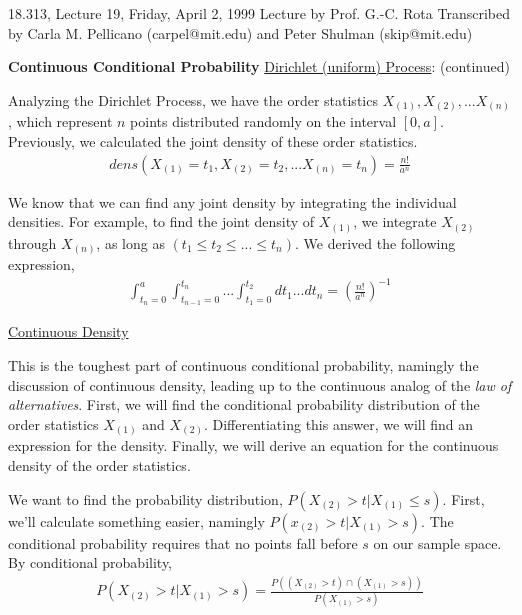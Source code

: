{\Large 18.313, Lecture 19, Friday, April 2, 1999}\newline
{\large Lecture by Prof. G.-C. Rota}\newline
Transcribed by Carla M. Pellicano (carpel@mit.edu) and Peter Shulman (skip@mit.edu)\newline

{\bf Continuous Conditional Probability}\newline
\noindent\underline{Dirichlet (uniform) Process}: (continued)

Analyzing the Dirichlet Process, we have the order statistics $X_{(1)},X_{(2)},...X_{(n)}$, which represent $n$ points distributed randomly on the interval $[0,a]$.  Previously, we calculated the joint density of these order statistics.
\begin{eqnarray*}
dens(X_{(1)}=t_1,X_{(2)}=t_2,...X_{(n)}=t_n)=\frac{n!}{a^n}
\end{eqnarray*}

We know that we can find any joint density by integrating the individual densities.  For example, to find the joint density of $X_{(1)}$, we integrate $X_{(2)}$ through $X_{(n)}$, as long as $(t_1\leq t_2\leq...\leq t_n)$.  We derived the following expression,
\begin{eqnarray*}
\int_{t_n=0}^a\!\int_{t_{n-1}=0}^{t_n}\!\!...\int_{t_1=0}^{t_2}\!\!dt_1...dt_n=\left(\frac{n!}{a^n}\right)^{-1}
\end{eqnarray*}

\noindent\underline{Continuous Density}

This is the toughest part of continuous conditional probability, namingly the discussion of continuous density, leading up to the continuous analog of the {\em law of alternatives}.  First, we will find the conditional probability distribution of the order statistics $X_{(1)}$ and $X_{(2)}$.  Differentiating this answer, we will find an expression for the density.  Finally, we will derive an equation for the continuous density of the order statistics.

We want to find the probability distribution, $P(X_{(2)}>t|X_{(1)}\leq s)$.  First, we'll calculate something easier, namingly $P(x_{(2)}>t|X_{(1)}>s)$.  The conditional probability requires that no points fall before $s$ on our sample space.  By conditional probability, 
\begin{eqnarray*}
P(X_{(2)}>t|X_{(1)}>s)=\frac{P((X_{(2)}>t)\cap(X_{(1)}>s))}{P(X_{(1)}>s)}
\end{eqnarray*}

